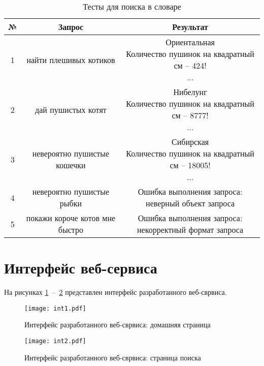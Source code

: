 \begin{table}[H]
  \caption{\label{table:tests} Тесты для поиска в словаре}
  \begin{center}
    \begin{tabular}{|c|c|c|}
      \hline
      № &  Запрос & Результат \\ \hline
      1 & найти плешивых котиков & \specialcell{Ориентальная\\Количество пушинок на квадратный см – 424!\\...} \\ \hline
      2 & дай пушистых котят & \specialcell{Нибелунг\\Количество пушинок на квадратный см – 8777!\\...} \\ \hline
      3 & невероятно пушистые кошечки & \specialcell{Сибирская\\Количество пушинок на квадратный см – 18005!\\...} \\ \hline
      4 & невероятно пушистые рыбки & \specialcell{Ошибка выполнения запроса:\\неверный объект запроса}  \\ \hline
      5 & покажи короче котов мне быстро & \specialcell{Ошибка выполнения запроса:\\ некорректный формат запроса}\\ \hline
    \end{tabular}
  \end{center}
\end{table}

\newpage

\section{Интерфейс веб-сервиса}
На рисунках \ref{img:int1}~--~\ref{img:int2} представлен интерфейс разработанного веб-сврвиса.

\begin{figure}[h!]
    \centering
    \texttt{[image: int1.pdf]}
    \caption{Интерфейс разработанного веб-сврвиса: домашняя страница}
    \label{img:int1}
\end{figure}

\begin{figure}[h!]
    \centering
    \texttt{[image: int2.pdf]}
    \caption{Интерфейс разработанного веб-сврвиса: страница поиска}
    \label{img:int2}
\end{figure}

\newpage